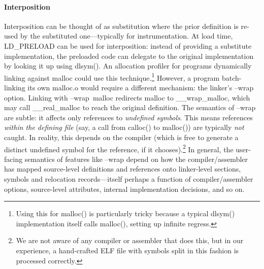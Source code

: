 \paragraph{Interposition}
Interposition can be thought of as substitution where the prior definition
is re-used by the substituted one---typically for instrumentation.
At load time, \textsf{LD\_PRELOAD} can be used for interposition: instead of providing a substitute implementation, the preloaded code can delegate to the original implementation by looking it up using \textsf{dlsym()}. 
An allocation profiler for programs dynamically linking against \textsf{malloc} could use this technique.\footnote{Using this for \textsf{malloc()} is particularly tricky because a typical \textsf{dlsym()} implementation itself calls \textsf{malloc()}, setting up infinite regress.}
However, a program batch-linking its own \textsf{malloc.o} would require a different mechanism: the linker's \textsf{--wrap} option. 
Linking with \textsf{--wrap~malloc} redirects \textsf{malloc} to \textsf{\_\_wrap\_malloc}, which may call \textsf{\_\_real\_malloc} to reach the original definition.
The semantics of \textsf{--wrap} are subtle: it affects only references to \emph{undefined symbols}.
This means references \emph{within the defining file} (say, a call from \textsf{calloc()} to \textsf{malloc()}) are typically \emph{not} caught. 
In reality, this depends on the compiler (which is free to generate a distinct undefined symbol for the reference, if it chooses).\footnote{We
are not aware of any compiler or assembler that does this, but in our experience, a hand-crafted ELF file with symbols split in this fashion is processed correctly.}
In general, the user-facing semantics of features like \textsf{--wrap} depend on how the compiler/assembler has mapped source-level definitions and references onto linker-level sections, symbols and relocation records---itself perhaps a function of compiler/assembler options, source-level attributes, internal implementation decisions, and so on.



